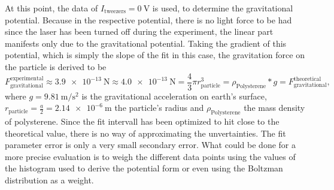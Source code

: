 \documentclass[../bericht.tex]{subfiles}
\begin{document}
      At this point, the data of $I_\mathrm{tweezers}=\SI{0}{\volt}$ is used, to determine the gravitational potential. Because in the respective potential, there is no light force to be had since the laser has been turned off during the experiment, the linear part manifests only due to the gravitational potential. Taking the gradient of this potential, which is simply the slope of the fit in this case, the gravitation force on the particle is derived to be
      \begin{equation*}
        F_\mathrm{gravitational}^\mathrm{experimental}\approx\SI{3,9e-13}{\newton}\approx \SI{4,0e-13}{\newton}=\frac{4}{3}\pi r_\mathrm{particle}^3= \rho_\mathrm{Polysterene}*g=F_\mathrm{gravitational}^\mathrm{theoretical},
      \end{equation*}
      where $g=\SI{9,81}{\meter\per\square\second}$ is the gravitational acceleration on earth's surface, $r_\mathrm{particle}=\frac{a}{2}=\SI{2,14e-6}{\meter}$ the particle's radius and $\rho_\mathrm{Polysterene}$ the mass density of polysterene. Since the fit intervall has been optimized to hit close to the theoretical value, there is no way of approximating the unvertainties. The fit parameter error is only a very small secondary error. What could be done for a more precise evaluation is to weigh the different data points using the values of the histogram used to derive the potential form or even using the Boltzman distribution as a weight.
      \medskip
\end{document}
